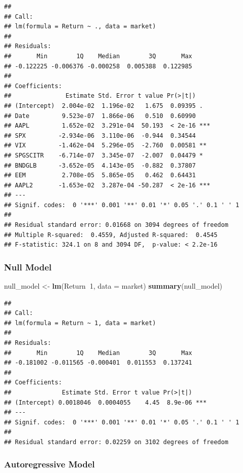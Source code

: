 \documentclass[]{article}
\newenvironment{Shaded}{\begin{snugshade}}{\end{snugshade}}
\newcommand{\KeywordTok}[1]{\textcolor[rgb]{0.13,0.29,0.53}{\textbf{#1}}}
\newcommand{\DataTypeTok}[1]{\textcolor[rgb]{0.13,0.29,0.53}{#1}}
\newcommand{\DecValTok}[1]{\textcolor[rgb]{0.00,0.00,0.81}{#1}}
\newcommand{\StringTok}[1]{\textcolor[rgb]{0.31,0.60,0.02}{#1}}
\newcommand{\OperatorTok}[1]{\textcolor[rgb]{0.81,0.36,0.00}{\textbf{#1}}}
\newcommand{\NormalTok}[1]{#1}
\begin{document}
\begin{verbatim}
## 
## Call:
## lm(formula = Return ~ ., data = market)
## 
## Residuals:
##       Min        1Q    Median        3Q       Max 
## -0.122225 -0.006376 -0.000258  0.005388  0.122985 
## 
## Coefficients:
##               Estimate Std. Error t value Pr(>|t|)    
## (Intercept)  2.004e-02  1.196e-02   1.675  0.09395 .  
## Date         9.523e-07  1.866e-06   0.510  0.60990    
## AAPL         1.652e-02  3.291e-04  50.193  < 2e-16 ***
## SPX         -2.934e-06  3.110e-06  -0.944  0.34544    
## VIX         -1.462e-04  5.296e-05  -2.760  0.00581 ** 
## SPGSCITR    -6.714e-07  3.345e-07  -2.007  0.04479 *  
## BNDGLB      -3.652e-05  4.143e-05  -0.882  0.37807    
## EEM          2.708e-05  5.865e-05   0.462  0.64431    
## AAPL2       -1.653e-02  3.287e-04 -50.287  < 2e-16 ***
## ---
## Signif. codes:  0 '***' 0.001 '**' 0.01 '*' 0.05 '.' 0.1 ' ' 1
## 
## Residual standard error: 0.01668 on 3094 degrees of freedom
## Multiple R-squared:  0.4559, Adjusted R-squared:  0.4545 
## F-statistic: 324.1 on 8 and 3094 DF,  p-value: < 2.2e-16
\end{verbatim}

\subsubsection{Null Model}\label{null-model}

\begin{Shaded}
\begin{Highlighting}[]
\NormalTok{null_model <-}\StringTok{ }\KeywordTok{lm}\NormalTok{(Return}\OperatorTok{~}\DecValTok{1}\NormalTok{, }\DataTypeTok{data =}\NormalTok{ market)}
\KeywordTok{summary}\NormalTok{(null_model)}
\end{Highlighting}
\end{Shaded}

\begin{verbatim}
## 
## Call:
## lm(formula = Return ~ 1, data = market)
## 
## Residuals:
##       Min        1Q    Median        3Q       Max 
## -0.181002 -0.011565 -0.000401  0.011553  0.137241 
## 
## Coefficients:
##              Estimate Std. Error t value Pr(>|t|)    
## (Intercept) 0.0018046  0.0004055    4.45  8.9e-06 ***
## ---
## Signif. codes:  0 '***' 0.001 '**' 0.01 '*' 0.05 '.' 0.1 ' ' 1
## 
## Residual standard error: 0.02259 on 3102 degrees of freedom
\end{verbatim}

\subsubsection{Autoregressive Model}\label{autoregressive-model}
\end{document}
